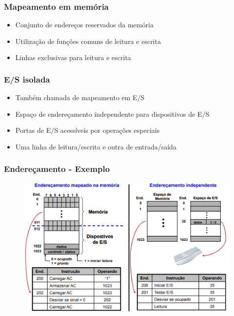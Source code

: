 \documentclass[aspectratio=169,
				xcolor=table]{beamer}
\begin{document}
	\begin{frame}
		\frametitle{Mapeamento em memória}
		\begin{itemize}
			\item Conjunto de endereços reservados da memória
			\vspace{1em}
			\item Utilização de funções comuns de leitura e escrita
			\vspace{1em}
			\item Linhas exclusivas para leitura e escrita
		\end{itemize}
	\end{frame}
	
	\begin{frame}
		\frametitle{E/S isolada}
		\begin{itemize}
			\item Também chamada de mapeamento em E/S
			\vspace{1em}
			\item Espaço de endereçamento independente para dispositivos de E/S
			\vspace{1em}
			\item Portas de E/S acessíveis por operações especiais
			\vspace{1em}
			\item Uma linha de leitura/escrita e outra de entrada/saída
		\end{itemize}
	\end{frame}
	
	\begin{frame}
		\frametitle{Endereçamento - Exemplo}
		\begin{figure}[hbtp]
		\centering
		\includegraphics[height=.8\textheight, keepaspectratio]{../figs/cap10/enderecamento.png}
		\end{figure}
		
	\end{frame}
\end{document}
